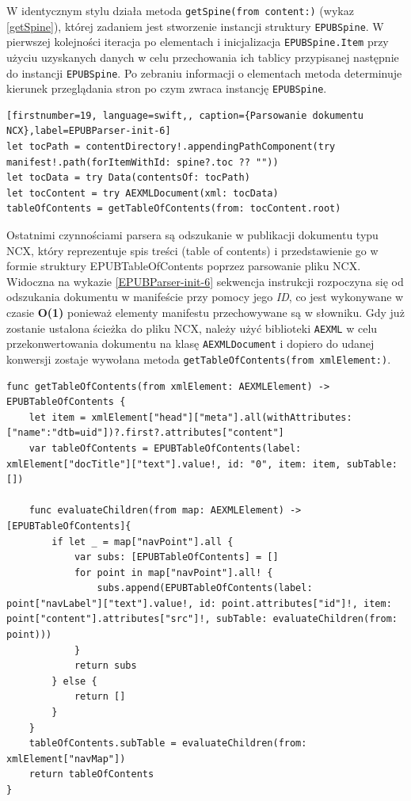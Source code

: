 W identycznym stylu działa metoda \texttt{getSpine(from content:)} (wykaz \ref{getSpine}), której zadaniem jest stworzenie instancji struktury \texttt{EPUBSpine}. W pierwszej kolejności iteracja po elementach i inicjalizacja \texttt{EPUBSpine.Item} przy użyciu uzyskanych danych w celu przechowania ich tablicy przypisanej następnie do instancji \texttt{EPUBSpine}. Po zebraniu informacji o elementach metoda determinuje kierunek przeglądania stron po czym zwraca instancję \texttt{EPUBSpine}.

\begin{lstlisting}[firstnumber=19, language=swift,, caption={Parsowanie dokumentu NCX},label=EPUBParser-init-6]
let tocPath = contentDirectory!.appendingPathComponent(try manifest!.path(forItemWithId: spine?.toc ?? ""))
let tocData = try Data(contentsOf: tocPath)
let tocContent = try AEXMLDocument(xml: tocData)
tableOfContents = getTableOfContents(from: tocContent.root)
\end{lstlisting}

Ostatnimi czynnościami parsera są odszukanie w publikacji dokumentu typu NCX, który reprezentuje spis treści (table of contents) i przedstawienie go w formie struktury EPUBTableOfContents poprzez parsowanie pliku NCX. Widoczna na wykazie \ref{EPUBParser-init-6} sekwencja instrukcji rozpoczyna się od odszukania dokumentu w manifeście przy pomocy jego \textit{ID}, co jest wykonywane w czasie \textbf{O(1)} ponieważ elementy manifestu przechowywane są w słowniku. Gdy już zostanie ustalona ścieżka do pliku NCX, należy użyć biblioteki \texttt{AEXML} w celu przekonwertowania dokumentu na klasę \texttt{AEXMLDocument} i dopiero do udanej konwersji zostaje wywołana metoda \texttt{getTableOfContents(from xmlElement:)}.

\begin{lstlisting}[caption={Implementacja metody \texttt{getTableOfContents(from xmlElement:)}},language=swift-reference,label=getTableOfContents]
func getTableOfContents(from xmlElement: AEXMLElement) -> EPUBTableOfContents {
    let item = xmlElement["head"]["meta"].all(withAttributes: ["name":"dtb=uid"])?.first?.attributes["content"]
    var tableOfContents = EPUBTableOfContents(label: xmlElement["docTitle"]["text"].value!, id: "0", item: item, subTable: [])

    func evaluateChildren(from map: AEXMLElement) -> [EPUBTableOfContents]{
        if let _ = map["navPoint"].all {
            var subs: [EPUBTableOfContents] = []
            for point in map["navPoint"].all! {
                subs.append(EPUBTableOfContents(label: point["navLabel"]["text"].value!, id: point.attributes["id"]!, item: point["content"].attributes["src"]!, subTable: evaluateChildren(from: point)))
            }
            return subs
        } else {
            return []
        }
    }
    tableOfContents.subTable = evaluateChildren(from: xmlElement["navMap"])
    return tableOfContents
}
\end{lstlisting}

